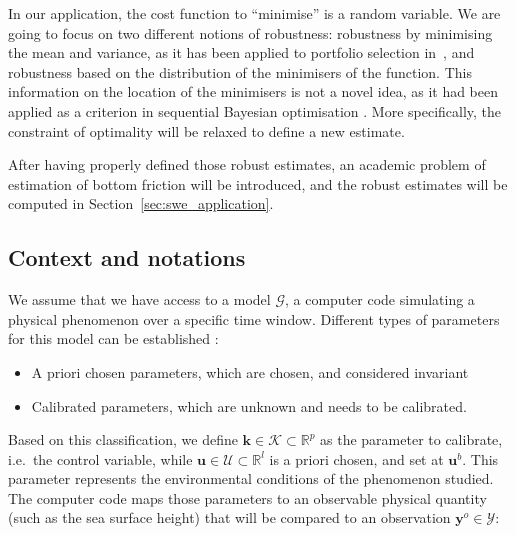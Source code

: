 \documentclass[npg, manuscript]{copernicus}
\newcommand{\yobs}{\mathbf{y}^o}
\begin{document}
In our application, the cost function to ``minimise'' is a random variable. We are going to focus on two different notions of robustness: robustness by minimising the mean and variance, as it has been applied to portfolio selection in~\cite{markowitz_portfolio_1952}, and robustness based on the distribution of the minimisers of the function. This information on the location of the minimisers is not a novel idea, as it had been applied as a criterion in sequential Bayesian optimisation \citep{villemonteix_informational_2006,hennig_entropy_2011}. More specifically, the constraint of optimality will be relaxed to define a new estimate.

After having properly defined those robust estimates, an academic problem of estimation of bottom friction will be introduced, and the robust estimates will be computed in Section~\ref{sec:swe_application}.





\subsection{Context and notations}

We assume that we have access to a model $\mathcal{G}$, a computer code simulating a physical phenomenon over a specific time window. Different types of parameters for this model can be established \citep{walker_defining_2003}:
\begin{itemize} 
\item A priori chosen parameters, which are chosen, and considered invariant
\item Calibrated parameters, which are unknown and needs to be calibrated.
\end{itemize}
Based on this classification, we define $\mathbf{k}\in \mathcal{K}\subset \mathbb{R}^p$ as the parameter to calibrate, i.e.\ the control variable, while $\mathbf{u}\in\mathcal{U}\subset\mathbb{R}^l$ is a priori chosen, and set at $\mathbf{u}^b$. This parameter represents the environmental conditions of the phenomenon studied.
The computer code maps those parameters to an observable physical quantity (such as the sea surface height) that will be compared to an observation $\yobs\in\mathcal{Y}$:
\end{document}
